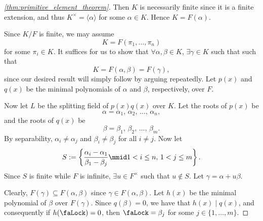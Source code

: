 \documentclass[notoc,notitlepage,nobib]{tufte-book}
\begin{document}
\begin{proof}[\cref{thm:primitive_element_theorem}]
   Then $K$ is necessarily finite since it is a finite
  extension, and thus $K^\times = \langle \alpha \rangle$ for some $\alpha \in
  K$. Hence $K = F(\alpha)$.

  \noindent
   Since $K / F$ is finite, we may assume
  \begin{equation*}
    K = F(\pi_1, \ldots, \pi_n)
  \end{equation*}
  for some $\pi_i \in K$. It suffices for us to show that $\forall \alpha, \beta
  \in K$, $\exists \gamma \in K$ such that
  such that
  \begin{equation*}
    K = F(\alpha, \beta) = F(\gamma),
  \end{equation*}
  since our desired result will simply follow by arguing repeatedly. Let $p(x)$
  and $q(x)$ be the minimal polynomials of $\alpha$ and $\beta$, respectively,
  over $F$.
  
  Now let $L$ be the splitting field of $p(x) q(x)$ over $K$. Let the roots of
  $p(x)$ be
  \begin{equation*}
    \alpha = \alpha_1, \, \alpha_2, \, \ldots, \, \alpha_n,
  \end{equation*}
  and the roots of $q(x)$ be
  \begin{equation*}
    \beta = \beta_1, \, \beta_2, \, \ldots, \, \beta_m.
  \end{equation*}
  By separability, $\alpha_i \neq \alpha_j$ and $\beta_i \neq \beta_j$ for all
  $i \neq j$. Now let 
  \begin{equation*}
    S := \left\{ \frac{\alpha_i - \alpha_1}{\beta_1 - \beta_j} \mmid 1 < i \leq
    n, \, 1 < j \leq m \right\}.
  \end{equation*}
  Since $S$ is finite while $F$ is infinite, $\exists u \in F^\times$ such that
  $u \notin S$. Let $\gamma = \alpha + u \beta$.

  \noindent
   Clearly, $F(\gamma) \subseteq
  F(\alpha, \beta)$ since $\gamma \in F(\alpha, \beta)$. Let $h(x)$ be the
  minimal polynomial of $\beta$ over $F(\gamma)$. Since $q(\beta) = 0$, we have
  that $h(x) \mid q(x)$, and consequently if $h(\faLock) = 0$, then $\faLock =
  \beta_j$ for some $j \in \{ 1, \ldots, m \}$.


\end{proof}
\end{document}
